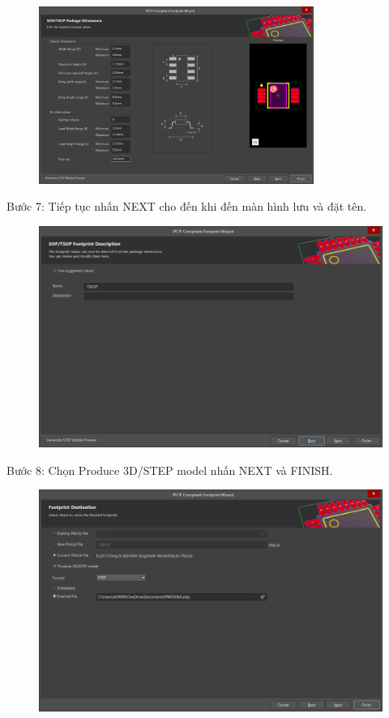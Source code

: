                 \begin{figure}[H]
                    \centering
                    \includegraphics[width=0.8\textwidth]{pictures/ch3.8.png}
                \end{figure}
                Bước 7: Tiếp tục nhấn NEXT cho đến khi đến màn hình lưu và đặt tên.
                \begin{figure}[H]
                    \centering
                    \includegraphics[width=1\textwidth]{pictures/ch3.9.png}
                \end{figure}
                Bước 8: Chọn Produce 3D/STEP model nhấn NEXT và FINISH.
                \begin{figure}[H]
                    \centering
                    \includegraphics[width=1\textwidth]{pictures/ch3.10.png}
                \end{figure}
